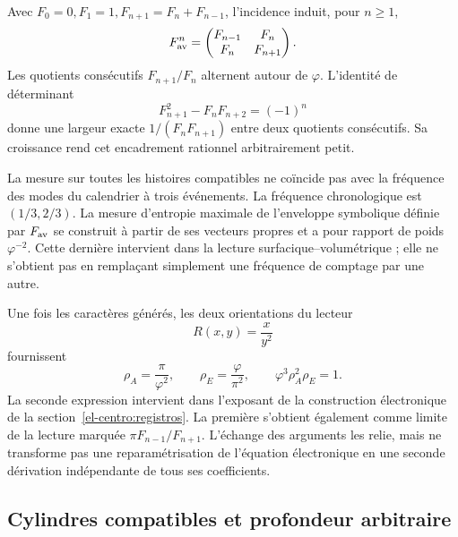 Avec \(F_0=0,F_1=1,F_{n+1}=F_n+F_{n-1}\), l'incidence induit, pour \(n\geq1\),
\[
 F_{\rm av}^n=\begin{pmatrix}F_{n-1}&F_n\\F_n&F_{n+1}\end{pmatrix}.
\]
Les quotients consécutifs \(F_{n+1}/F_n\) alternent autour de \(\varphi\). L'identité de déterminant
\[
 F_{n+1}^2-F_nF_{n+2}=(-1)^n
\]
donne une largeur exacte \(1/(F_nF_{n+1})\) entre deux quotients consécutifs. Sa croissance rend cet encadrement rationnel arbitrairement petit.

La mesure sur toutes les histoires compatibles ne coïncide pas avec la fréquence des modes du calendrier à trois événements. La fréquence chronologique est \((1/3,2/3)\). La mesure d'entropie maximale de l'enveloppe symbolique définie par \(F_{\rm av}\) se construit à partir de ses vecteurs propres et a pour rapport de poids \(\varphi^{-2}\). Cette dernière intervient dans la lecture surfacique--volumétrique ; elle ne s'obtient pas en remplaçant simplement une fréquence de comptage par une autre.




Une fois les caractères générés, les deux orientations du lecteur
\[
 R(x,y)=\frac{x}{y^2}
\]
fournissent
\begin{equation}
 \rho_A=\frac\pi{\varphi^2},\qquad
 \rho_E=\frac\varphi{\pi^2},\qquad
 \varphi^3\rho_A^2\rho_E=1.
 \label{eq:areal-electron}
\end{equation}
La seconde expression intervient dans l’exposant de la construction électronique de la section~\ref{el-centro:registros}. La première s’obtient également comme limite de la lecture marquée \(\pi F_{n-1}/F_{n+1}\). L’échange des arguments les relie, mais ne transforme pas une reparamétrisation de l’équation électronique en une seconde dérivation indépendante de tous ses coefficients.




\subsection{Cylindres compatibles et profondeur arbitraire}


